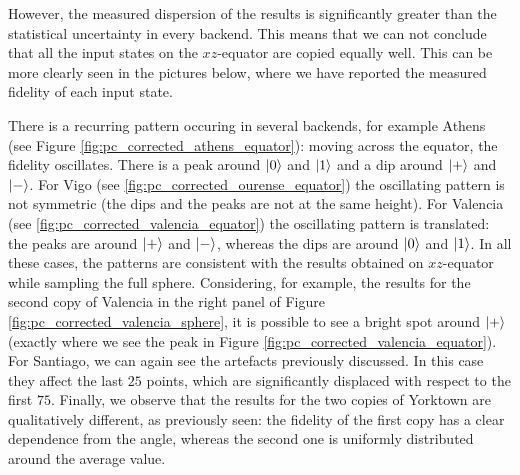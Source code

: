 However, the measured dispersion of the results is significantly greater than the statistical uncertainty in every backend. 
This means that we can not conclude that all the input states on the $xz$-equator are copied equally well. 
This can be more clearly seen in the pictures below, where we have reported the measured fidelity of each input state.

There is a recurring pattern occuring in several backends, for example Athens (see Figure \ref{fig:pc_corrected_athens_equator}):
moving across the equator, the fidelity oscillates. There is a peak around $\ket{0}$ and $\ket{1}$ and a dip around $\ket{+}$ and $\ket{-}$.
For Vigo (see \ref{fig:pc_corrected_ourense_equator}) the oscillating pattern is not symmetric (the dips and the peaks are not at the same height). 
For Valencia (see \ref{fig:pc_corrected_valencia_equator}) the oscillating pattern is translated: the peaks are around $\ket{+}$ and $\ket{-}$, whereas the dips are around $\ket{0}$ and $\ket{1}$.
In all these cases, the patterns are consistent with the results obtained on $xz$-equator while sampling the full sphere. 
Considering, for example, the results for the second copy of Valencia in the right panel of Figure \ref{fig:pc_corrected_valencia_sphere}, it is possible to see a bright spot around $\ket{+}$ (exactly where we see the peak in Figure \ref{fig:pc_corrected_valencia_equator}).
For Santiago, we can again see the artefacts previously discussed. In this case they affect the last $25$ points, which are significantly displaced with respect to the first $75$.
Finally, we observe that the results for the two copies of Yorktown are qualitatively different, as previously seen: the fidelity of the first copy has a clear dependence from the angle, whereas the second one is uniformly distributed around the average value.

